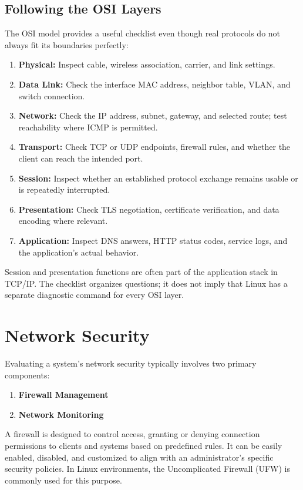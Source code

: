 \documentclass[journal]{IEEEtran}
\begin{document}
\subsection{Following the OSI Layers}
The OSI model provides a useful checklist even though real protocols do not always fit its boundaries perfectly:
\begin{enumerate}
    \item \textbf{Physical:} Inspect cable, wireless association, carrier, and link settings.
    \item \textbf{Data Link:} Check the interface MAC address, neighbor table, VLAN, and switch connection.
    \item \textbf{Network:} Check the IP address, subnet, gateway, and selected route; test reachability where ICMP is permitted.
    \item \textbf{Transport:} Check TCP or UDP endpoints, firewall rules, and whether the client can reach the intended port.
    \item \textbf{Session:} Inspect whether an established protocol exchange remains usable or is repeatedly interrupted.
    \item \textbf{Presentation:} Check TLS negotiation, certificate verification, and data encoding where relevant.
    \item \textbf{Application:} Inspect DNS answers, HTTP status codes, service logs, and the application's actual behavior.
\end{enumerate}
Session and presentation functions are often part of the application stack in TCP/IP. The checklist organizes questions; it does not imply that Linux has a separate diagnostic command for every OSI layer.

 \section{Network Security}

Evaluating a system's network security typically involves two primary components:
\begin{enumerate}
    \item \textbf{Firewall Management}
    \item \textbf{Network Monitoring}
\end{enumerate}

A firewall is designed to control access, granting or denying connection permissions to clients and systems based on predefined rules. It can be easily enabled, disabled, and customized to align with an administrator's specific security policies. In Linux environments, the Uncomplicated Firewall (UFW) is commonly used for this purpose.
\end{document}
